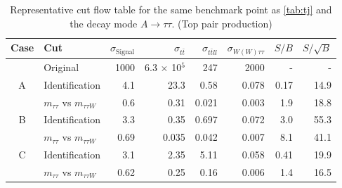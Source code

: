 \begin{table}
\centering
\begin{adjustwidth*}{0in}{-0.8in}
  \caption{Representative cut flow table for the same benchmark point as \autoref{tab:tj} and the decay mode $A\rightarrow\tau\tau$. (Top pair production)}
\begin{tabular}{clrrrrrr}
  \toprule
  Case    & Cut                                & $\sigma_\text{Signal}$ & $\sigma_{t\bar{t}}$ & $\sigma_{t\bar{t}ll}$ & $\sigma_{W(W)\tau\tau}$ & $S/B$ & $S/\sqrt{B}$	\\\midrule
          & Original                           & 1000                   & 6.3 $\times$ 10$^5$ & 247                   & 2000                    & -     & - \\\midrule
  A       & Identification                     & 4.1                    & 23.3                & 0.58                  & 0.078                   & 0.17  & 14.9		\\
          & $m_{\tau\tau}$ vs $m_{\tau\tau W}$ & 0.6                    & 0.31                & 0.021                 & 0.003                   & 1.9   & 18.8		\\\midrule
  B       & Identification                     & 3.3                    & 0.35                & 0.697                 & 0.072                   & 3.0   & 55.3		\\
          & $m_{\tau\tau}$ vs $m_{\tau\tau W}$ & 0.69                   & 0.035               & 0.042                 & 0.007                   & 8.1   & 41.1		\\\midrule
  C       & Identification                     & 3.1                    & 2.35                & 5.11                  & 0.058                   & 0.41  & 19.9		\\
          & $m_{\tau\tau}$ vs $m_{\tau\tau W}$ & 0.62                   & 0.25                & 0.16                  & 0.006                   & 1.4   & 16.5		\\\midrule
\end{tabular}
\label{tab:tt}
\end{adjustwidth*}
\end{table}


